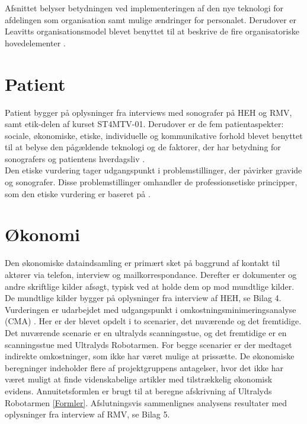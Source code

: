 Afsnittet belyser betydningen ved implementeringen af den nye teknologi for afdelingen som organisation samt mulige ændringer for personalet. Derudover er Leavitts organisationsmodel blevet benyttet til at beskrive de fire organisatoriske hovedelementer \cite{Leavitt}.

\section{Patient}
Patient bygger på oplysninger fra interviews med sonografer på HEH og RMV, samt etik-delen af kurset ST4MTV-01. Derudover er de fem patientaspekter: sociale, økonomiske, etiske, individuelle og kommunikative forhold blevet benyttet til at belyse den pågældende teknologi og de faktorer, der har betydning for sonografers og patientens hverdagsliv \cite{Leavitt}.\\ 
Den etiske vurdering tager udgangspunkt i problemstillinger, der påvirker gravide og sonografer. Disse problemstillinger omhandler de professionsetiske principper, som den etiske vurdering er baseret på \cite{Husted}\cite{Etiskehjul}.

\section{Økonomi}
Den økonomiske dataindsamling er primært sket på baggrund af kontakt til aktører via telefon, interview og mailkorrespondance. Derefter er dokumenter og andre skriftlige kilder afsøgt, typisk ved at holde dem op mod mundtlige kilder. De mundtlige kilder bygger på oplysninger fra interview af HEH, se Bilag 4. Vurderingen er udarbejdet med udgangspunkt i omkostningsminimeringsanalyse (CMA) \cite{Leavitt}. Her er der blevet opdelt i to scenarier, det nuværende og det fremtidige. Det nuværende scenarie er en ultralyds scanningsstue, og det fremtidige er en scanningsstue med Ultralyds Robotarmen. For begge scenarier er der medtaget indirekte omkostninger, som ikke har været mulige at prissætte. De økonomiske beregninger indeholder flere af projektgruppens antagelser, hvor det ikke har været muligt at finde videnskabelige artikler med tilstrækkelig økonomisk evidens. Annuitetsformlen er brugt til at beregne afskrivning af Ultralyds Robotarmen \ref{Formler}. Afslutningsvis sammenlignes analysens resultater med oplysninger fra interview af RMV, se Bilag 5. 